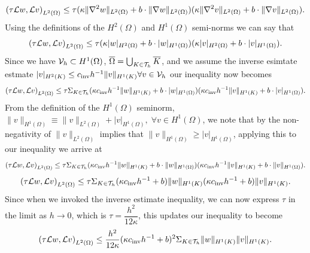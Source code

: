 \documentclass{article}
\begin{document}
\begin{itemize}
	\begin{equation*}
		\left(\tau\mathcal{L} w, \mathcal{L} v \right)_{L^2(\Omega)} \leq \tau(\kappa\|\nabla^2 w\|_{L^2(\Omega)} + b\cdot\|\nabla w\|_{L^2(\Omega)})(\kappa\|\nabla^2 v\|_{L^2(\Omega)} + b\cdot\|\nabla v\|_{L^2(\Omega)}).
	\end{equation*}
	Using the definitions of the \(H^2(\Omega) \) and \(H^1(\Omega) \) semi-norms we can say that
	\begin{equation*}
		\left(\tau\mathcal{L} w, \mathcal{L} v \right)_{L^2(\Omega)} \leq \tau(\kappa|w|_{H^2(\Omega)} + b\cdot| w|_{H^1(\Omega)})(\kappa|v|_{H^2(\Omega)} + b\cdot|v|_{H^1(\Omega)}).
	\end{equation*}
	Since we have \(\mathcal{V}_h \subset H^1(\Omega) \), \(\overline{\Omega} = \bigcup_{K\in\mathcal{T}_h}\overline{K}\), and we assume the inverse esimtate estmate \(|v|_{H^2(K)} \leq c_\text{inv}h^{-1}\|v\|_{H^1(K)} \forall v \in \mathcal{V}_h \) our inequality now becomes
	\begin{equation*}
		\left(\tau\mathcal{L} w, \mathcal{L} v \right)_{L^2(\Omega)} \leq \tau\Sigma_{K\in\mathcal{T}_h}(\kappa c_\text{inv}h^{-1}\|w\|_{H^1(K)} + b\cdot| w|_{H^1(\Omega)})(\kappa c_\text{inv}h^{-1}\|v\|_{H^1(K)} + b\cdot|v|_{H^1(\Omega)}).
	\end{equation*}
	From the definition of the \(H^1(\Omega) \) seminorm, \(\|v\|_{H^1(\Omega)} \equiv \|v\|_{L^2(\Omega)} + |v|_{H^1(\Omega)}, \; \forall v \in H^1(\Omega) \), we note that by the non-negativity of \(\|v\|_{L^2(\Omega)} \) implies that \(\|v\|_{H^1(\Omega)} \geq |v|_{H^1(\Omega)} \), applying this to our inequality we arrive at
	\begin{equation*}
		\left(\tau\mathcal{L} w, \mathcal{L} v \right)_{L^2(\Omega)} \leq \tau\Sigma_{K\in\mathcal{T}_h}(\kappa c_\text{inv}h^{-1}\|w\|_{H^1(K)} + b\cdot\| w\|_{H^1(\Omega)})(\kappa c_\text{inv}h^{-1}\|v\|_{H^1(K)} + b\cdot\|v\|_{H^1(\Omega)}).
	\end{equation*}
	\begin{equation*}
		\left(\tau\mathcal{L} w, \mathcal{L} v \right)_{L^2(\Omega)} \leq \tau\Sigma_{K\in\mathcal{T}_h}(\kappa c_\text{inv}h^{-1}+b)\|w\|_{H^1(K)} (\kappa c_\text{inv}h^{-1} + b)\|v\|_{H^1(K)}.
	\end{equation*}
	Since when we invoked the inverse estimate inequality, we can now express \(\tau\) in the limit as \(h \to 0 \), which is \(\tau = \dfrac{h^2}{12\kappa} \), this updates our inequality to become
	\begin{equation*}
		\left(\tau\calL w, \calL v \right)_{L^2(\Omega)} \leq \frac{h^2}{12\kappa}(\kappa c_\text{inv}h^{-1}+b)^2 \Sigma_{K\in\calT_h} \|w\|_{H^1(K)} \|v\|_{H^1(K)}.

\end{equation*}
\end{itemize}
\end{document}
